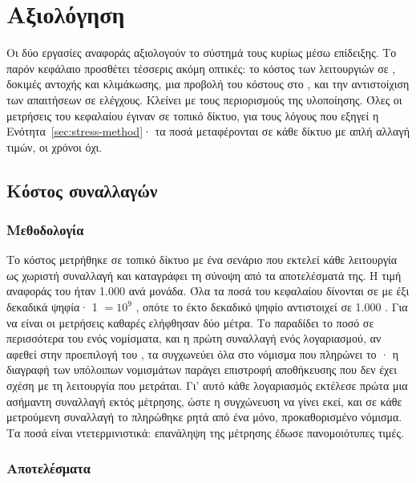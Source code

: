 \chapter{Αξιολόγηση}
\label{ch:axiologisi}

Οι δύο εργασίες αναφοράς \cite{hadjichristofi2022, papias2023} αξιολογούν το σύστημά τους
κυρίως μέσω επίδειξης. Το παρόν κεφάλαιο προσθέτει τέσσερις ακόμη οπτικές: το κόστος των
λειτουργιών σε , δοκιμές αντοχής και κλιμάκωσης, μια προβολή του κόστους στο
, και την αντιστοίχιση των απαιτήσεων σε ελέγχους. Κλείνει με τους περιορισμούς της υλοποίησης.
Όλες οι μετρήσεις του κεφαλαίου έγιναν σε τοπικό δίκτυο, για τους λόγους που εξηγεί η
Ενότητα~\ref{sec:stress-method}· τα ποσά  μεταφέρονται σε κάθε δίκτυο με απλή
αλλαγή τιμών, οι χρόνοι όχι.

\section{Κόστος συναλλαγών}
\label{sec:gas-eval}

\subsection{Μεθοδολογία}

Το κόστος μετρήθηκε σε τοπικό δίκτυο με ένα σενάριο που εκτελεί κάθε λειτουργία ως χωριστή
συναλλαγή και καταγράφει τη σύνοψη  από τα αποτελέσματά της. Η τιμή αναφοράς του
 ήταν 1.000  ανά μονάδα. Όλα τα ποσά του κεφαλαίου δίνονται σε 
με έξι δεκαδικά ψηφία· 1  $= 10^{9}$ , οπότε το έκτο δεκαδικό ψηφίο
αντιστοιχεί σε 1.000 . Για να είναι οι μετρήσεις καθαρές ελήφθησαν δύο
μέτρα. Το  παραδίδει το ποσό σε περισσότερα του ενός νομίσματα, και η πρώτη
συναλλαγή ενός λογαριασμού, αν αφεθεί στην προεπιλογή του , τα συγχωνεύει όλα στο
νόμισμα που πληρώνει το · η διαγραφή των υπόλοιπων νομισμάτων παράγει επιστροφή
αποθήκευσης που δεν έχει σχέση με τη λειτουργία που μετράται. Γι' αυτό κάθε λογαριασμός
εκτέλεσε πρώτα μια ασήμαντη συναλλαγή εκτός μέτρησης, ώστε η συγχώνευση να γίνει εκεί, και
σε κάθε μετρούμενη συναλλαγή το  πληρώθηκε ρητά από ένα μόνο, προκαθορισμένο
νόμισμα. Τα ποσά είναι ντετερμινιστικά: επανάληψη της
μέτρησης έδωσε πανομοιότυπες τιμές.

\subsection{Αποτελέσματα}

